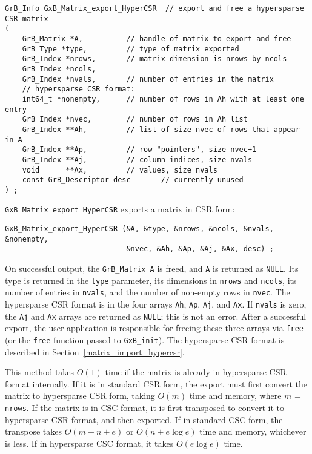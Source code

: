 \documentclass[12pt]{article}
\begin{document}
\begin{mdframed}[userdefinedwidth=6in]
{\footnotesize
\begin{verbatim}
GrB_Info GxB_Matrix_export_HyperCSR  // export and free a hypersparse CSR matrix
(
    GrB_Matrix *A,          // handle of matrix to export and free
    GrB_Type *type,         // type of matrix exported
    GrB_Index *nrows,       // matrix dimension is nrows-by-ncols
    GrB_Index *ncols,
    GrB_Index *nvals,       // number of entries in the matrix
    // hypersparse CSR format:
    int64_t *nonempty,      // number of rows in Ah with at least one entry
    GrB_Index *nvec,        // number of rows in Ah list
    GrB_Index **Ah,         // list of size nvec of rows that appear in A
    GrB_Index **Ap,         // row "pointers", size nvec+1
    GrB_Index **Aj,         // column indices, size nvals
    void      **Ax,         // values, size nvals
    const GrB_Descriptor desc       // currently unused
) ;
\end{verbatim}
} \end{mdframed}

\verb'GxB_Matrix_export_HyperCSR' exports a matrix in CSR form:

\vspace{-0.05in}
{\footnotesize
\begin{verbatim}
GxB_Matrix_export_HyperCSR (&A, &type, &nrows, &ncols, &nvals, &nonempty,
                            &nvec, &Ah, &Ap, &Aj, &Ax, desc) ; \end{verbatim}}

\vspace{-0.10in}
On successful output, the \verb'GrB_Matrix A' is freed, and \verb'A' is
returned as \verb'NULL'.  Its type is returned in the \verb'type' parameter,
its dimensions in \verb'nrows' and \verb'ncols', its number of entries in
\verb'nvals', and the number of non-empty rows in \verb'nvec'.  The hypersparse
CSR format is in the four arrays \verb'Ah', \verb'Ap', \verb'Aj', and
\verb'Ax'.  If \verb'nvals' is zero, the \verb'Aj' and \verb'Ax' arrays are
returned as \verb'NULL'; this is not an error.  After a successful export, the
user application is responsible for freeing these three arrays via
\verb'free' (or the \verb'free' function passed to \verb'GxB_init').  The hypersparse CSR format is described in
Section~\ref{matrix_import_hypercsr}.

This method takes $O(1)$ time if the matrix is already in hypersparse CSR
format internally.  If it is in standard CSR form, the export must first
convert the matrix to hypersparse CSR form, taking $O(m)$ time and memory,
where $m$ = \verb'nrows'.  If the matrix is in CSC format, it is first
transposed to convert it to hypersparse CSR format, and then exported.  If in
standard CSC form, the transpose takes $O(m+n+e)$ or $O(n + e \log e)$ time and
memory, whichever is less.  If in hypersparse CSC format, it takes $O(e \log
e)$ time.
\end{document}
